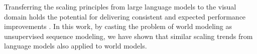 Transferring the scaling principles from large language models to the visual domain holds the potential for delivering consistent and expected performance improvements \citep{tay2022scale,dehghani2023scaling,hoogeboom2023simple,ho2022imagen,peebles2023scalable}. In this work, by casting the problem of world modeling as unsupervised sequence modeling, we have shown that similar scaling trends from language models also applied to world models.
